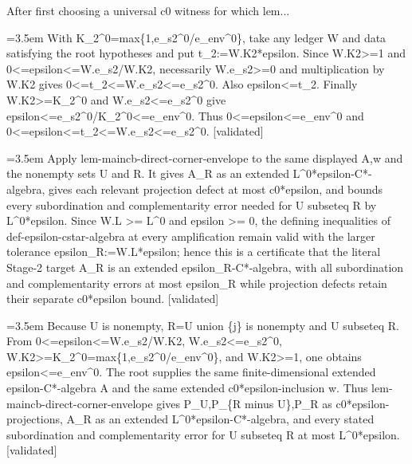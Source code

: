 \documentclass{article}
\newcommand{\step}[1]{\par\noindent\hangindent=3.5em\hangafter=1%
  \makebox[3.5em][l]{\textbf{#1.}}}
\newcommand{\steptag}[1]{\hfill{\small\textsf{[#1]}}}
\begin{document}
\begin{proofbox}{After first choosing a universal c0 witness for which lem...}
\step{1.2} With K\_2\textasciicircum{}0=max\{1,e\_s2\textasciicircum{}0/e\_env\textasciicircum{}0\}, take any ledger W and data satisfying the root hypotheses and put t\_2:=W.K2*epsilon. Since W.K2>=1 and 0<=epsilon<=W.e\_s2/W.K2, necessarily W.e\_s2>=0 and multiplication by W.K2 gives 0<=t\_2<=W.e\_s2<=e\_s2\textasciicircum{}0. Also epsilon<=t\_2. Finally W.K2>=K\_2\textasciicircum{}0 and W.e\_s2<=e\_s2\textasciicircum{}0 give epsilon<=e\_s2\textasciicircum{}0/K\_2\textasciicircum{}0<=e\_env\textasciicircum{}0. Thus 0<=epsilon<=e\_env\textasciicircum{}0 and 0<=epsilon<=t\_2<=W.e\_s2<=e\_s2\textasciicircum{}0. \steptag{validated} \\[4pt]
\step{1.3} Apply lem-maincb-direct-corner-envelope to the same displayed A,w and the nonempty sets U and R. It gives A\_R as an extended L\textasciicircum{}0*epsilon-C*-algebra, gives each relevant projection defect at most c0*epsilon, and bounds every subordination and complementarity error needed for U subseteq R by L\textasciicircum{}0*epsilon. Since W.L >= L\textasciicircum{}0 and epsilon >= 0, the defining inequalities of def-epsilon-cstar-algebra at every amplification remain valid with the larger tolerance epsilon\_R:=W.L*epsilon; hence this is a certificate that the literal Stage-2 target A\_R is an extended epsilon\_R-C*-algebra, with all subordination and complementarity errors at most epsilon\_R while projection defects retain their separate c0*epsilon bound. \steptag{validated} \\[6pt]
\step{1.3.1} Because U is nonempty, R=U union \{j\} is nonempty and U subseteq R. From 0<=epsilon<=W.e\_s2/W.K2, W.e\_s2<=e\_s2\textasciicircum{}0, W.K2>=K\_2\textasciicircum{}0=max\{1,e\_s2\textasciicircum{}0/e\_env\textasciicircum{}0\}, and W.K2>=1, one obtains epsilon<=e\_env\textasciicircum{}0. The root supplies the same finite-dimensional extended epsilon-C*-algebra A and the same extended c0*epsilon-inclusion w. Thus lem-maincb-direct-corner-envelope gives P\_U,P\_\{R minus U\},P\_R as c0*epsilon-projections, A\_R as an extended L\textasciicircum{}0*epsilon-C*-algebra, and every stated subordination and complementarity error for U subseteq R at most L\textasciicircum{}0*epsilon. \steptag{validated} \\[4pt]

\end{proofbox}
\end{document}
